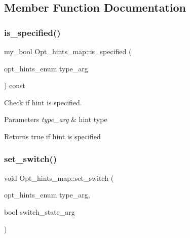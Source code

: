 \subsection{Member Function Documentation}
\mbox{\label{classOpt__hints__map_a48d7456abac078864a2edc3c55e0bdbf}} 
\subsubsection{\texorpdfstring{is\+\_\+specified()}{is\_specified()}}
{\footnotesize\ttfamily my\+\_\+bool Opt\+\_\+hints\+\_\+map\+::is\+\_\+specified (\begin{DoxyParamCaption}\item[{opt\+\_\+hints\+\_\+enum}]{type\+\_\+arg }\end{DoxyParamCaption}) const\hspace{0.3cm}{\ttfamily [inline]}}

Check if hint is specified.


\begin{DoxyParams}{Parameters}
{\em type\+\_\+arg} & hint type\\
\hline
\end{DoxyParams}
\begin{DoxyReturn}{Returns}
true if hint is specified 
\end{DoxyReturn}
\mbox{\label{classOpt__hints__map_a5fd4fb3a278d54ce94545ceac008f0f7}} 
\subsubsection{\texorpdfstring{set\+\_\+switch()}{set\_switch()}}
{\footnotesize\ttfamily void Opt\+\_\+hints\+\_\+map\+::set\+\_\+switch (\begin{DoxyParamCaption}\item[{opt\+\_\+hints\+\_\+enum}]{type\+\_\+arg,  }\item[{bool}]{switch\+\_\+state\+\_\+arg }\end{DoxyParamCaption})\hspace{0.3cm}{\ttfamily [inline]}}

